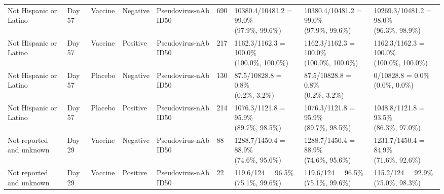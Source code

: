 \documentclass[]{book}
\theoremstyle{definition}
\theoremstyle{definition}
\theoremstyle{definition}
\newcommand{\1}{\mathbbm{1}}
\begin{document}
\begin{landscape}
\begin{ThreePartTable}
\begin{longtable}[t]{>{\raggedright\arraybackslash}p{2.7cm}llllllll}
\hspace{1em}Not Hispanic or Latino & Day 57 & Vaccine & Negative & Pseudovirus-nAb ID50 & 690 & \makecell[l]{10380.4/10481.2 = 99.0\%\\(97.9\%, 99.6\%)} & \makecell[l]{10380.4/10481.2 = 99.0\%\\(97.9\%, 99.6\%)} & \makecell[l]{10269.3/10481.2 = 98.0\%\\(96.3\%, 98.9\%)}\\
\hspace{1em}Not Hispanic or Latino & Day 57 & Vaccine & Positive & Pseudovirus-nAb ID50 & 217 & \makecell[l]{1162.3/1162.3 = 100.0\%\\(100.0\%, 100.0\%)} & \makecell[l]{1162.3/1162.3 = 100.0\%\\(100.0\%, 100.0\%)} & \makecell[l]{1162.3/1162.3 = 100.0\%\\(100.0\%, 100.0\%)}\\
\hspace{1em}Not Hispanic or Latino & Day 57 & Placebo & Negative & Pseudovirus-nAb ID50 & 130 & \makecell[l]{87.5/10828.8 = 0.8\%\\(0.2\%, 3.2\%)} & \makecell[l]{87.5/10828.8 = 0.8\%\\(0.2\%, 3.2\%)} & \makecell[l]{0/10828.8 = 0.0\%\\(0.0\%, 0.0\%)}\\
\hspace{1em}Not Hispanic or Latino & Day 57 & Placebo & Positive & Pseudovirus-nAb ID50 & 214 & \makecell[l]{1076.3/1121.8 = 95.9\%\\(89.7\%, 98.5\%)} & \makecell[l]{1076.3/1121.8 = 95.9\%\\(89.7\%, 98.5\%)} & \makecell[l]{1048.8/1121.8 = 93.5\%\\(86.3\%, 97.0\%)}\\
\hspace{1em}Not reported and unknown & Day 29 & Vaccine & Negative & Pseudovirus-nAb ID50 & 88 & \makecell[l]{1288.7/1450.4 = 88.9\%\\(74.6\%, 95.6\%)} & \makecell[l]{1288.7/1450.4 = 88.9\%\\(74.6\%, 95.6\%)} & \makecell[l]{1231.7/1450.4 = 84.9\%\\(71.6\%, 92.6\%)}\\
\hspace{1em}Not reported and unknown & Day 29 & Vaccine & Positive & Pseudovirus-nAb ID50 & 22 & \makecell[l]{119.6/124 = 96.5\%\\(75.1\%, 99.6\%)} & \makecell[l]{119.6/124 = 96.5\%\\(75.1\%, 99.6\%)} & \makecell[l]{115.2/124 = 92.9\%\\(75.0\%, 98.3\%)}\\

\end{longtable}
\end{ThreePartTable}
\end{landscape}
\end{document}
